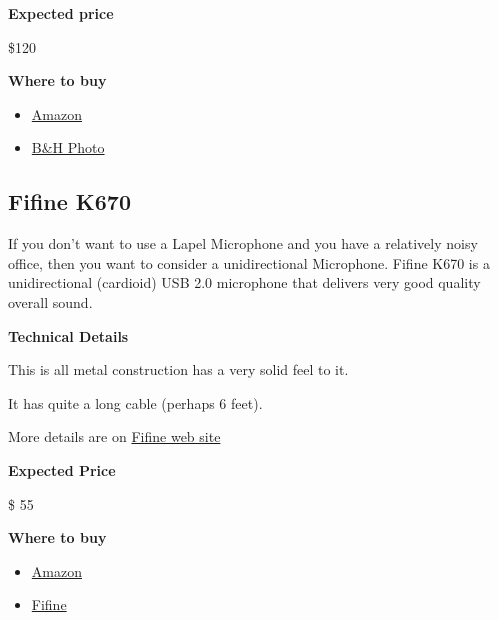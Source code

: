 \begin{gram}
\textbf{Expected price}

\$120

\textbf{Where to buy}

\begin{itemize}

\item \href{https://www.amazon.com/Samson-Wireless-Microphone-System-SWXPD2BLM8/dp/B07HPRZBKC/ref=sr_1_6?crid=3V47B7B3X9SJ5&keywords=wireless+usb+lapel+microphone&qid=1582899680&sprefix=Wireless+USB+lapel+,aps,143&sr=8-6}{Amazon}

\item 
\href{https://www.bhphotovideo.com/c/product/1440151-REG/samson_swxpd2blm8_xpd2_lavalier_usb_wireless.html/?ap=y&ap=y&smp=y&smp=y&lsft=BI%3A514&gclid=EAIaIQobChMIiIOHy-_06QIVUopaBR150wxWEAQYASABEgJL5vD_BwE}{B\&H Photo}
\end{itemize}
\end{gram}

\subsection{Fifine K670}

\begin{gram}
If you don't want to use a Lapel Microphone and you have a relatively
noisy office, then you want to consider a unidirectional Microphone.
Fifine K670 is a unidirectional (cardioid) USB 2.0 microphone that
delivers very good quality overall sound.

\textbf{Technical Details}

This is all metal construction has a very solid feel to it.

It has quite a long cable (perhaps 6 feet).

More details are on \href{https://fifinemicrophone.com/products/usb-microphone-for-mac-and-windows-k670}{Fifine web site}

\textbf{Expected Price}

\$ 55

\textbf{Where to buy}

\begin{itemize}
\item 
\href{https://www.amazon.com/Microphone-FIFINE-Computers-Podcasting-K670/dp/B079HRFH2Y/ref=asc_df_B079HRFH2Y/?tag=hyprod-20&linkCode=df0&hvadid=380013417597&hvpos=&hvnetw=g&hvrand=6999453823816156640&hvpone=&hvptwo=&hvqmt=&hvdev=c&hvdvcmdl=&hvlocint=&hvlocphy=1025202&hvtargid=pla-878206170477&psc=1&language=en_US&tag=&ref=&adgrpid=77922879259&hvpone=&hvptwo=&hvadid=380013417597&hvpos=&hvnetw=g&hvrand=6999453823816156640&hvqmt=&hvdev=c&hvdvcmdl=&hvlocint=&hvlocphy=1025202&hvtargid=pla-878206170477}{Amazon}
\item \href{https://fifinemicrophone.com/products/usb-microphone-for-mac-and-windows-k670}{Fifine}
\end{itemize}
\end{gram}



